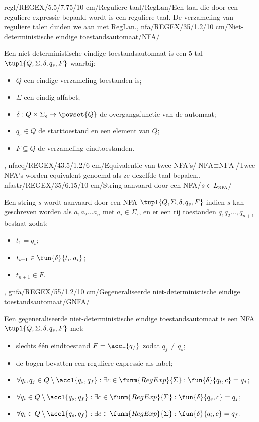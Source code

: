 regl/REGEX/5.5/7.75/10 cm/Reguliere taal/$\mbox{RegLan}$/{Een taal die door een reguliere expressie bepaald wordt is een reguliere taal. De verzameling van reguliere talen duiden we aan met $\mbox{RegLan}$.},
nfa/REGEX/35/1.2/10 cm/Niet-deterministische eindige toestandsautomaat/NFA/{Een niet-deterministische eindige toestandsautomaat is een $5$-tal $\tupl{Q,\Sigma,\delta,q_s,F}$ waarbij:\begin{itemize}
 \item $Q$ een eindige verzameling toestanden is;
 \item $\Sigma$ een eindig alfabet;
 \item $\delta:Q\times\Sigma_{\epsilon}\rightarrow\powset{Q}$ de overgangsfunctie van de automaat;
 \item $q_s\in Q$ de starttoestand en een element van $Q$;
 \item $F\subseteq Q$ de verzameling eindtoestanden.
\end{itemize}},
nfaeq/REGEX/43.5/1.2/6 cm/Equivalentie van twee NFA's/$\mbox{NFA}\equiv\mbox{NFA}$/{Twee NFA's worden equivalent genoemd als ze dezelfde taal bepalen.},
nfastr/REGEX/35/6.15/10 cm/String aanvaard door een NFA/$s\in L_{\mbox{\tiny NFA}}$/{Een string $s$ wordt aanvaard door een NFA $\tupl{Q,\Sigma,\delta,q_s,F}$ indien $s$ kan geschreven worden als $a_1a_2\ldots a_n$ met $a_i\in\Sigma_{\epsilon}$, en er een rij toestanden $q_1q_2\ldots,q_{n+1}$ bestaat zodat:\begin{itemize}
 \item $t_1=q_s$;
 \item $t_{i+1}\in\fun{\delta}{t_i,a_i}$;
 \item $t_{n+1}\in F$.
\end{itemize}},
gnfa/REGEX/55/1.2/10 cm/Gegeneraliseerde niet-deterministische eindige toestandsautomaat/GNFA/{Een gegeneraliseerde niet-deterministische eindige toestandsautomaat is een NFA $\tupl{Q,\Sigma,\delta,q_s,F}$ met:\begin{itemize}
 \item slechts \'e\'en eindtoestand $F=\accl{q_f}$ zodat $q_f\neq q_s$;
 \item de bogen bevatten een reguliere expressie als label;
 \item $\forall q_i,q_j\in Q\setminus\accl{q_s,q_f}:\exists c\in\funm{RegExp}{\Sigma}:\fun{\delta}{q_i,c}=q_j$;
 \item $\forall q_i\in Q\setminus\accl{q_s,q_f}:\exists c\in\funm{RegExp}{\Sigma}:\fun{\delta}{q_s,c}=q_j$;
 \item $\forall q_i\in Q\setminus\accl{q_s,q_f}:\exists c\in\funm{RegExp}{\Sigma}:\fun{\delta}{q_i,c}=q_f$.
\end{itemize}}